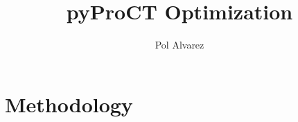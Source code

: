 \documentclass[a4paper,12pt,twoside,hidelinks]{report}
\begin{document}
\title{\LARGE { \vspace*{25mm} \bf pyProCT Optimization}\\
 \vspace*{6mm}
}

\author{Pol Alvarez}

\normallinespacing
\maketitle
\thispagestyle{empty}

\body


\chapter{Methodology}
\label{chap:method}















\end{document}
